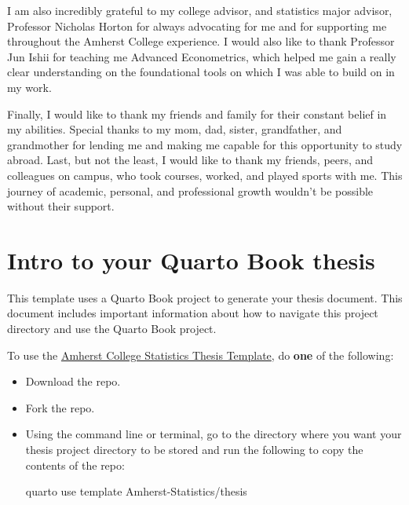 \documentclass[
  11pt,
  letterpaper,
  twoside]{report}
\newenvironment{Shaded}{}{}
\newcommand{\NormalTok}[1]{\textcolor[rgb]{0.22,0.23,0.26}{#1}}
\begin{document}
I am also incredibly grateful to my college advisor, and statistics
major advisor, Professor Nicholas Horton for always advocating for me
and for supporting me throughout the Amherst College experience. I would
also like to thank Professor Jun Ishii for teaching me Advanced
Econometrics, which helped me gain a really clear understanding on the
foundational tools on which I was able to build on in my work.

Finally, I would like to thank my friends and family for their constant
belief in my abilities. Special thanks to my mom, dad, sister,
grandfather, and grandmother for lending me and making me capable for
this opportunity to study abroad. Last, but not the least, I would like
to thank my friends, peers, and colleagues on campus, who took courses,
worked, and played sports with me. This journey of academic, personal,
and professional growth wouldn't be possible without their support.

\cleardoublepage{}\setcounter{page}{1}


\chapter{Intro to your Quarto Book thesis}\label{sec-intro}

This template uses a Quarto Book project to generate your thesis
document. This document includes important information about how to
navigate this project directory and use the Quarto Book project.

To use the
\href{https://github.com/Amherst-Statistics/thesis?tab=readme-ov-file\#amherst-college-statistics-thesis-template}{Amherst
College Statistics Thesis Template}, do \textbf{one} of the following:

\begin{itemize}
\item
  Download the repo.
\item
  Fork the repo.
\item
  Using the command line or terminal, go to the directory where you want
  your thesis project directory to be stored and run the following to
  copy the contents of the repo:

\begin{Shaded}
\begin{Highlighting}[numbers=left,,]
\NormalTok{quarto use template Amherst{-}Statistics/thesis}
\end{Highlighting}
\end{Shaded}
\end{itemize}
\end{document}
